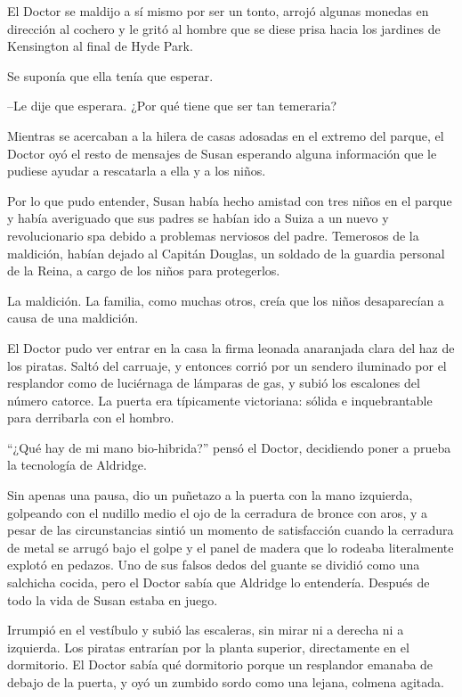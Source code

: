 El Doctor se maldijo a sí mismo por ser un tonto, arrojó algunas monedas en dirección al cochero y le gritó al hombre que se diese prisa hacia los jardines de Kensington al final de Hyde Park.
 
Se suponía que ella tenía que esperar.

--Le dije que esperara. ¿Por qué tiene que ser tan temeraria?
 
Mientras se acercaban a la hilera de casas adosadas en el extremo del parque, el Doctor oyó el resto de mensajes de Susan esperando alguna información que le pudiese ayudar a rescatarla a ella y a los niños.
 
Por lo que pudo entender, Susan había hecho amistad con tres niños en el parque y había averiguado que sus padres se habían ido a Suiza a un nuevo y revolucionario spa debido a problemas nerviosos del padre. Temerosos de la maldición, habían dejado al Capitán Douglas, un soldado de la guardia personal de la Reina, a cargo de los niños para protegerlos.
 
La maldición. La familia, como muchas otros, creía que los niños desaparecían a causa de una maldición.
 
El Doctor pudo ver entrar en la casa la firma leonada anaranjada clara del haz de los piratas. Saltó del carruaje, y entonces corrió por un sendero iluminado por el resplandor como de luciérnaga de lámparas de gas, y subió los escalones del número catorce. La puerta era típicamente victoriana: sólida e inquebrantable para derribarla con el hombro.
 
``¿Qué hay de mi mano bio-hibrida?'' pensó el Doctor, decidiendo poner a prueba la tecnología de Aldridge.
 
Sin apenas una pausa, dio un puñetazo a la puerta con la mano izquierda, golpeando con el nudillo medio el ojo de la cerradura de bronce con aros, y a pesar de las circunstancias sintió un momento de satisfacción cuando la cerradura de metal se arrugó bajo el golpe y el panel de madera que lo rodeaba literalmente explotó en pedazos. Uno de sus falsos dedos del guante se dividió como una salchicha cocida, pero el Doctor sabía que Aldridge lo entendería. Después de todo la vida de Susan estaba en juego.
 
Irrumpió en el vestíbulo y subió las escaleras, sin mirar ni a derecha ni a izquierda. Los piratas entrarían por la planta superior, directamente en el dormitorio. El Doctor sabía qué dormitorio porque un resplandor emanaba de debajo de la puerta, y oyó un zumbido sordo como una lejana, colmena agitada.
 
